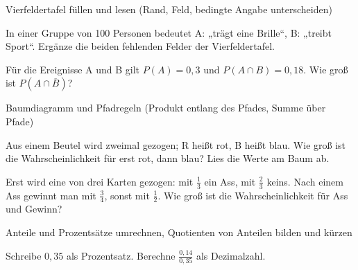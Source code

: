 \setcounter{aufgabe}{0}

\begin{aufgabe}{Vierfeldertafel füllen und lesen (Rand, Feld, bedingte Angabe unterscheiden)}
\begin{teile}
\teil In einer Gruppe von 100 Personen bedeutet A: „trägt eine Brille“, B: „treibt Sport“. Ergänze die beiden fehlenden Felder der Vierfeldertafel.

\leerfeld \quad \leerfeld
\teil Für die Ereignisse A und B gilt $P(A) = 0{,}3$ und $P(A \cap B) = 0{,}18$. Wie groß ist $P(A \cap \overline{B})$? \leerfeld
\end{teile}
\end{aufgabe}

\begin{aufgabe}{Baumdiagramm und Pfadregeln (Produkt entlang des Pfades, Summe über Pfade)}
\begin{teile}
\teil Aus einem Beutel wird zweimal gezogen; R heißt rot, B heißt blau. Wie groß ist die Wahrscheinlichkeit für erst rot, dann blau? Lies die Werte am Baum ab.

\leerfeld
\teil Erst wird eine von drei Karten gezogen: mit $\frac{1}{3}$ ein Ass, mit $\frac{2}{3}$ keins. Nach einem Ass gewinnt man mit $\frac{3}{4}$, sonst mit $\frac{1}{2}$. Wie groß ist die Wahrscheinlichkeit für Ass und Gewinn? \leerfeld
\end{teile}
\end{aufgabe}

\begin{aufgabe}{Anteile und Prozentsätze umrechnen, Quotienten von Anteilen bilden und kürzen}
\begin{teile}
\teil Schreibe $0{,}35$ als Prozentsatz. \leerfeld[\%]
\teil Berechne $\frac{0{,}14}{0{,}35}$ als Dezimalzahl. \leerfeld
\end{teile}
\end{aufgabe}

